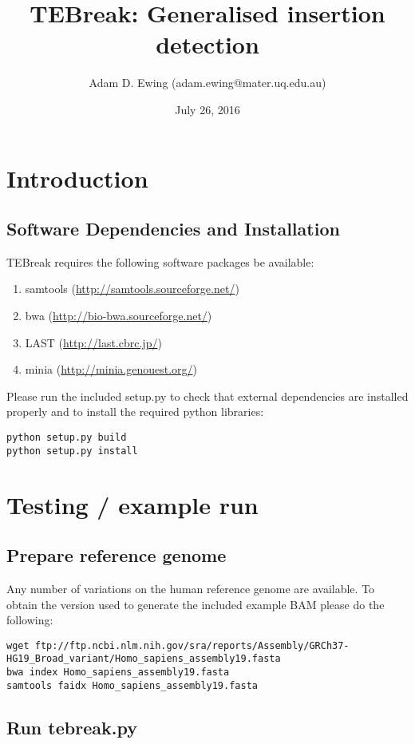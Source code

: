 \documentclass[letterpaper,11pt]{article}
\title{TEBreak: Generalised insertion detection}
\author{Adam D. Ewing (adam.ewing@mater.uq.edu.au)}
\begin{document}
 \date{July 26, 2016}
 \maketitle

\section{Introduction}
\subsection{Software Dependencies and Installation}
TEBreak requires the following software packages be available:

\begin{enumerate}
  \item samtools (\url{http://samtools.sourceforge.net/})
  \item bwa (\url{http://bio-bwa.sourceforge.net/})
  \item LAST (\url{http://last.cbrc.jp/})
  \item minia (\url{http://minia.genouest.org/})
\end{enumerate}

Please run the included setup.py to check that external dependencies are installed properly and to install the required python libraries:

\begin{verbatim}
python setup.py build
python setup.py install
\end{verbatim}

\section{Testing / example run}
\subsection{Prepare reference genome}
Any number of variations on the human reference genome are available. To obtain the version used to generate the included example BAM please do the following:
\begin{verbatim}
wget ftp://ftp.ncbi.nlm.nih.gov/sra/reports/Assembly/GRCh37-HG19_Broad_variant/Homo_sapiens_assembly19.fasta
bwa index Homo_sapiens_assembly19.fasta
samtools faidx Homo_sapiens_assembly19.fasta
\end{verbatim}

\subsection{Run tebreak.py}
\end{document}
